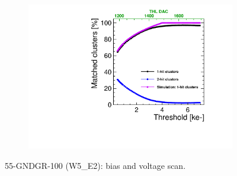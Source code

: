 \begin{figure}[htbp] \centering
  \begin{subfigure}[b]{0.45\textwidth}
    \includegraphics[width=\textwidth]{./figures/TestBeam/ThresholdScan_W0005_E02.pdf}
    \caption{}
  \end{subfigure} \hfill
  \begin{subfigure}[b]{0.45\textwidth}
    \caption{}
  \end{subfigure}
  \caption{55-GNDGR-100 (W5\_E2): bias and voltage scan.}
  \label{fig:Timepix3_THLscan_Vdep_E2}
\end{figure}


